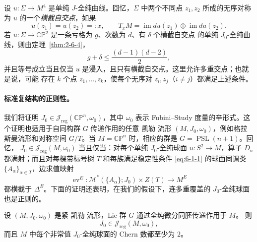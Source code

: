 \begin{remark}\label{rem:7-4-2}
设 $u:\Sigma\to M^4$ 是单纯 $J$-全纯曲线。回忆，$\Sigma$ 中两个不同点
$z_1,z_2$ 所成的无序对称为 $u$ 的一个\emph{横截自交点}，如果
\[
  u(z_1)=u(z_2)=:x,
  \qquad
  T_xM=\operatorname{im}du(z_1)\oplus\operatorname{im}du(z_2).
\]
若 $u:\Sigma\to\mathbb{CP}^2$ 是一条亏格为 $g$、次数为 $d$、有 $\delta$ 个横截自交点
的单纯 $J_0$-全纯曲线，则由定理~\ref{thm:2-6-4}，
\[
  g+\delta\le\frac{(d-1)(d-2)}2,
\]
并且等号成立当且仅当 $u$ 是浸入，且只有横截自交点。这里允许多重交点；也就是说，可能
存在 $k$ 个点 $z_1,\ldots,z_k$，使每个无序对 $z_i,z_j$（$i\ne j$）都满足上述条件。
\end{remark}

\paragraph{标准复结构的正则性。}
我们将证明 $J_0\in\mathcal J_{\mathrm{reg}}(\mathbb{CP}^n,\omega_0)$，其中 $\omega_0$
表示 Fubini--Study 度量的辛形式。这个证明也适用于自同构群 $G$ 传递作用的任意 凯勒
流形 $(M,J_0,\omega_0)$，例如格拉斯曼流形和对称空间 $G/T$。当
$M=\mathbb{CP}^n$ 时，相应的群是 $G=\operatorname{PSL}(n+1)$。回忆，
$J_0\in\mathcal J_{\mathrm{reg}}(M,\omega_0)$ 当且仅当：对每个单纯 $J_0$-全纯球面
$u:S^2\to M$，算子 $D_u$ 都满射；而且对每棵带标号树 $T$ 和每族满足稳定性条件
\eqref{eq:6-1-1} 的球面同调类 $\{A_\alpha\}_{\alpha\in T}$，边求值映射
\[
  \operatorname{ev}^E:
  \mathcal M^*(\{A_\alpha\};J_0)\times Z(T)
  \longrightarrow M^E
\]
都横截于 $\Delta^E$。下面的证明还表明，在我们的假设下，连多重覆盖的
$J_0$-全纯球面也是正则的。

\begin{proposition}\label{prop:7-4-3}
设 $(M,J_0,\omega_0)$ 是紧 凯勒 流形，Lie 群 $G$ 通过全纯微分同胚传递作用于 $M$。
则
\[
  J_0\in\mathcal J_{\mathrm{reg}}(M,\omega_0),
\]
而且 $M$ 中每个非常值 $J_0$-全纯球面的 Chern 数都至少为 $2$。
\end{proposition}

